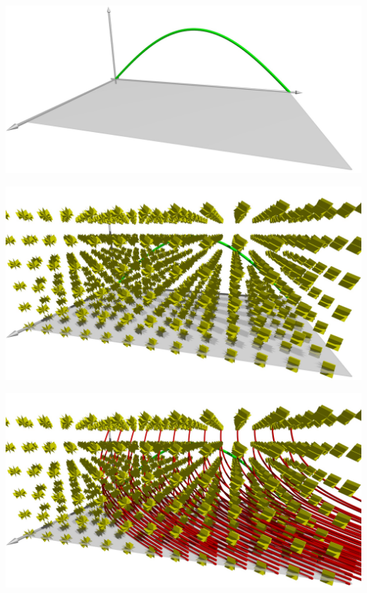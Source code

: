 \begin{frame}
\begin{center}
\includegraphics[width=\hsize]{../../common/3d/cauchy.jpg}
\end{center}
\end{frame}

\begin{frame}
\begin{center}
\includegraphics[width=\hsize]{../../common/3d/planes.jpg}
\end{center}
\end{frame}

\begin{frame}
\begin{center}
\includegraphics[width=\hsize]{../../common/3d/chrpl.jpg}
\end{center}
\end{frame}

